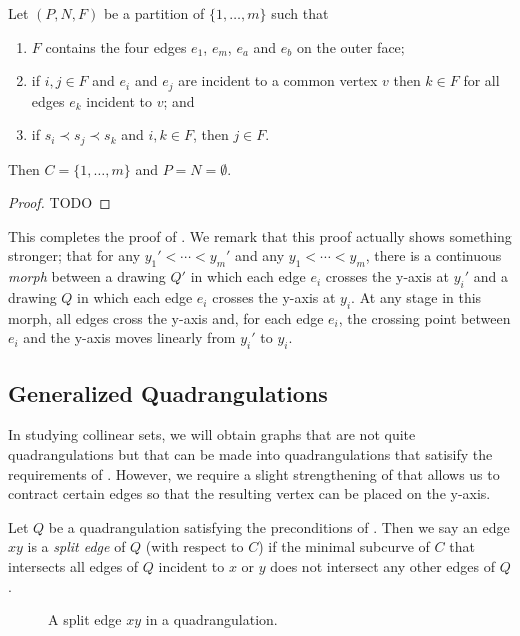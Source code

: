 \documentclass{patmorin}
\begin{document}
\begin{lem}
   Let $(P,N,F)$ be a partition of $\{1,\ldots,m\}$ such that 
   \begin{enumerate}
    \item $F$ contains the four edges $e_1$, $e_m$, $e_a$ and $e_b$
      on the outer face;
    \item if $i,j\in F$ and $e_i$ and $e_j$ are incident to a common
      vertex $v$ then $k\in F$ for all edges $e_k$ incident to $v$; and
    \item if $s_i \prec s_j \prec s_k$ and $i,k\in F$, 
      then $j\in F$.
   \end{enumerate}
   Then $C=\{1,\ldots,m\}$ and $P=N=\emptyset$.
\end{lem}

\begin{proof}
    TODO
\end{proof}

This completes the proof of .  We remark that this proof
actually shows something stronger; that for any $y_1'<\cdots<y_m'$
and any $y_1<\cdots<y_m$, there is a continuous \emph{morph} \cite{x,y,z,w}
between a drawing $Q'$ in which each edge $e_i$ crosses the y-axis at
$y_i'$ and a drawing $Q$ in which each edge $e_i$ crosses the y-axis
at $y_i$.  At any stage in this morph, all edges cross the y-axis and, for each edge $e_i$, the crossing point between $e_i$ and the y-axis moves linearly from $y_i'$ to $y_i$.

\subsection{Generalized Quadrangulations}

In studying collinear sets, we will obtain graphs that are not quite
quadrangulations but that can be made into quadrangulations that
satisify the requirements of . However, we require a slight
strengthening of  that allows us to contract certain edges
so that the resulting vertex can be placed on the y-axis.

Let $Q$ be a quadrangulation satisfying the preconditions of
. Then we say an edge $xy$ is a \emph{split edge} of $Q$
(with respect to $C$) if the minimal subcurve of $C$ that intersects all
edges of $Q$ incident to $x$ or $y$ does not intersect any other edges
of $Q$.

\begin{figure}
   \caption{A split edge $xy$ in a quadrangulation.}
\end{figure}
\end{document}
